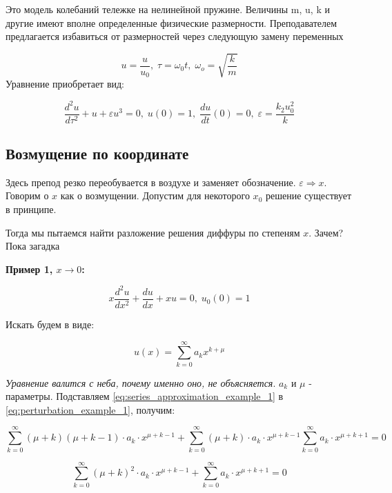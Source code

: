 	Это модель колебаний тележке на нелинейной пружине. Величины m, u, k и другие имеют вполне определенные физические размерности. Преподавателем предлагается избавиться от размерностей через следующую замену переменных
	
	$$
	u = \frac u {u_0}, \; \tau = \omega_0t, \; \omega_o = \sqrt{\frac k m }
	$$
	Уравнение приобретает вид:
	
	\begin{equation}
		\frac{d^2u}{d\tau^2} + u + \varepsilon u^3 = 0, \; u(0) = 1, \; \frac {du}{dt}(0) = 0, \; \varepsilon = \frac {k_2 u_0^2} {k}
	\end{equation}
	
	\subsection{Возмущение по координате}
	
	Здесь препод резко переобувается в воздухе и заменяет обозначение. $\varepsilon \Rightarrow x$. Говорим о $x$ как о возмущении. Допустим для некоторого $x_0$ решение существует в принципе.
	
	Тогда мы пытаемся найти разложение решения диффуры по степеням $x$. Зачем? Пока загадка
	
	\textbf{Пример 1, $x\to0$:}
	
	\begin{equation}
		x \frac{d^2 u} {dx^2} + \frac {du} {dx} + xu = 0, \; u_0(0) = 1
		\label{eq:perturbation_example_1}
	\end{equation}
	
	Искать будем в виде:
	
	\begin{equation}
		u(x) = \sum_{k=0}^\infty a_k x^{k+\mu}
		\label{eq:series_approximation_example_1}
	\end{equation}
	
	\textit{Уравнение валится с неба, почему именно оно, не объясняется}. $a_k$ и $\mu$ - параметры. Подставляем \eqref{eq:series_approximation_example_1} в \eqref{eq:perturbation_example_1}, получим:
	
	\begin{equation}
		\sum_{k=0}^\infty (\mu + k) (\mu + k - 1) \cdot a_k \cdot x^{\mu + k - 1} + \sum_{k = 0} ^ \infty (\mu + k) \cdot a_k \cdot x^{\mu + k - 1} \sum_{k=0}^\infty a_k \cdot x^{\mu + k + 1} = 0
	\end{equation}
	
	\begin{equation}
		\sum_{k=0}^\infty (\mu + k)^2 \cdot a_k \cdot x^{\mu + k - 1}
		+ \sum_{k = 0}^\infty a_k \cdot x ^ {\mu + k + 1} = 0
	\end{equation}
	
